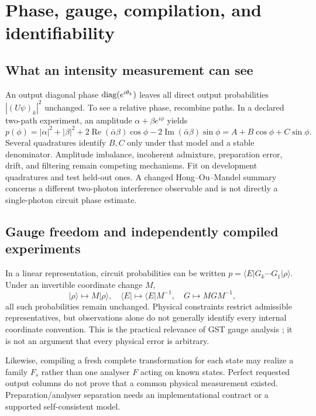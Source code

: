 \documentclass[11pt,a4paper]{article}
\begin{document}
\section{Phase, gauge, compilation, and identifiability}
\subsection{What an intensity measurement can see}
An output diagonal phase $\operatorname{diag}(e^{i\theta_k})$ leaves all direct output probabilities $|(U\psi)_k|^2$ unchanged. To see a relative phase, recombine paths. In a declared two-path experiment, an amplitude $\alpha+\beta e^{i\phi}$ yields
\begin{equation}
p(\phi)=|\alpha|^2+|\beta|^2+
2\operatorname{Re}(\bar\alpha\beta)\cos\phi
-2\operatorname{Im}(\bar\alpha\beta)\sin\phi
=A+B\cos\phi+C\sin\phi.
\end{equation}
Several quadratures identify $B,C$ only under that model and a stable denominator. Amplitude imbalance, incoherent admixture, preparation error, drift, and filtering remain competing mechanisms. Fit on development quadratures and test held-out ones. A changed Hong--Ou--Mandel summary concerns a different two-photon interference observable and is not directly a single-photon circuit phase estimate.

\subsection{Gauge freedom and independently compiled experiments}
In a linear representation, circuit probabilities can be written $p=\langle E|G_k\cdots G_1|\rho\rangle$. Under an invertible coordinate change $M$,
\begin{equation}
|\rho\rangle\mapsto M|\rho\rangle,\quad
\langle E|\mapsto\langle E|M^{-1},\quad
G\mapsto MGM^{-1},
\end{equation}
all such probabilities remain unchanged. Physical constraints restrict admissible representatives, but observations alone do not generally identify every internal coordinate convention. This is the practical relevance of GST gauge analysis \cite{gst}; it is not an argument that every physical error is arbitrary.

Likewise, compiling a fresh complete transformation for each state may realize a family $F_s$ rather than one analyser $F$ acting on known states. Perfect requested output columns do not prove that a common physical measurement existed. Preparation/analyser separation needs an implementational contract or a supported self-consistent model.
\end{document}
